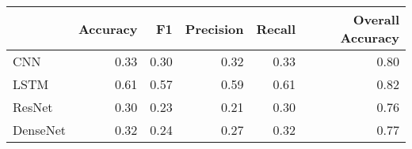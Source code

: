 \begin{tabular}{lrrrrr}
\toprule
{} &  Accuracy &    F1 &  Precision &  Recall &  Overall Accuracy \\
\midrule
CNN      &      0.33 &  0.30 &       0.32 &    0.33 &              0.80 \\
LSTM     &      0.61 &  0.57 &       0.59 &    0.61 &              0.82 \\
ResNet   &      0.30 &  0.23 &       0.21 &    0.30 &              0.76 \\
DenseNet &      0.32 &  0.24 &       0.27 &    0.32 &              0.77 \\
\bottomrule
\end{tabular}

